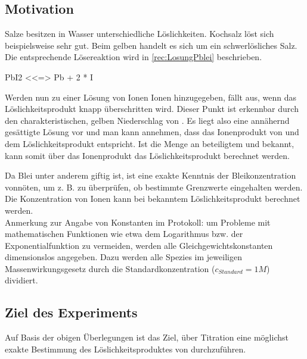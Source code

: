 \documentclass{article}
\begin{document}
    \subsection{Motivation} \label{sec:Motivation}
    
      Salze besitzen in Wasser unterschiedliche Löslichkeiten. Kochsalz  löst sich beispielsweise sehr gut. Beim gelben  handelt es sich um ein schwerlösliches Salz. Die entsprechende Lösereaktion wird in \ref{rec:LosungPblei} beschrieben. 
           
      \begin{reaction}
        PbI2\sld{} <<=> Pb\pch[2]\aq{} +  2 * I\mch\aq{} \label{rec:LosungPblei}
      \end{reaction}
      
      Werden nun zu einer Lösung von  Ionen  Ionen hinzugegeben, fällt  aus, wenn das Löslichkeitsprodukt knapp überschritten wird. Dieser Punkt ist erkennbar durch den charakteristischen, gelben Niederschlag von . Es liegt also eine annähernd gesättigte Lösung vor und man kann annehmen, dass das Ionenprodukt von  und  dem Löslichkeitsprodukt entspricht. Ist die Menge an beteiligtem  und  bekannt, kann somit über das Ionenprodukt das Löslichkeitsprodukt berechnet werden.
      
      Da Blei unter anderem giftig ist, ist eine exakte Kenntnis der Bleikonzentration vonnöten, um z. B. zu überprüfen, ob bestimmte Grenzwerte eingehalten werden. Die Konzentration von  Ionen kann bei bekanntem Löslichkeitsprodukt berechnet werden. \\
      
      Anmerkung zur Angabe von Konstanten im Protokoll: um Probleme mit mathematischen Funktionen wie etwa dem Logarithmus bzw. der Exponentialfunktion zu vermeiden, werden alle Gleichgewichtskonstanten dimensionslos angegeben. Dazu werden alle Spezies im jeweiligen Massenwirkungsgesetz durch die Standardkonzentration ($c_{Standard} = 1 M$) dividiert.
    
    \subsection{Ziel des Experiments}
    
      Auf Basis der obigen Überlegungen ist das Ziel, über Titration eine möglichst exakte Bestimmung des Löslichkeitsproduktes von  durchzuführen.
    
\end{document}

